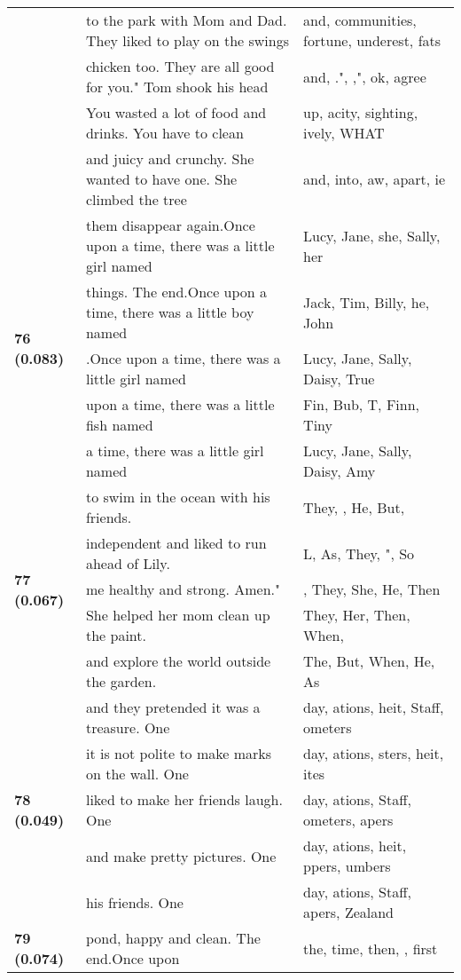 \documentclass{article}
\begin{document}
\begin{adjustbox}{max width=\textwidth}
\begin{tabular}{p{} p{} p{}}
 & to the park with Mom and Dad. They liked to play on the swings & and,  communities,  fortune,  underest,  fats \\
 & chicken too. They are all good for you."  Tom shook his head & and, .", ,", ok,  agree \\
 & You wasted a lot of food and drinks. You have to clean & up, acity,  sighting, ively,  WHAT \\
 & and juicy and crunchy. She wanted to have one. She climbed the tree & and,  into, aw,  apart, ie \\
\midrule
\multirow{5}{*}{\textbf{76 (0.083)}} & them disappear again.Once upon a time, there was a little girl named & Lucy,  Jane,  she,  Sally,  her \\
 & things. The end.Once upon a time, there was a little boy named & Jack,  Tim,  Billy,  he,  John \\
 & .Once upon a time, there was a little girl named & Lucy,  Jane,  Sally,  Daisy,  True \\
 & upon a time, there was a little fish named & Fin,  Bub,  T,  Finn,  Tiny \\
 & a time, there was a little girl named & Lucy,  Jane,  Sally,  Daisy,  Amy \\
\midrule
\multirow{5}{*}{\textbf{77 (0.067)}} & to swim in the ocean with his friends. & They,  ,  He,  But, \\
 & independent and liked to run ahead of Lily. & L, As, They, ", So \\
 & me healthy and strong. Amen." & ,  They,  She,  He,  Then \\
 & She helped her mom clean up the paint. & They,  Her,  Then,  When, \\
 & and explore the world outside the garden. & The, But, When, He, As \\
\midrule
\multirow{5}{*}{\textbf{78 (0.049)}} & and they pretended it was a treasure.  One & day, ations, heit, Staff, ometers \\
 & it is not polite to make marks on the wall.  One & day, ations, sters, heit, ites \\
 & liked to make her friends laugh.  One & day, ations, Staff, ometers, apers \\
 & and make pretty pictures. One & day, ations, heit, ppers, umbers \\
 & his friends. One & day, ations, Staff, apers,  Zealand \\
\midrule
\multirow{5}{*}{\textbf{79 (0.074)}} & pond, happy and clean. The end.Once upon & the,  time,  then,  ,  first \\

\end{tabular}
\end{adjustbox}
\end{document}
